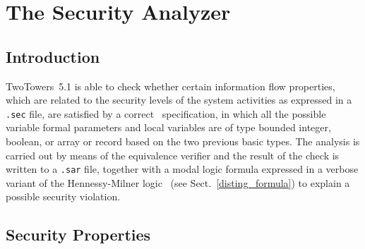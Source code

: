 \chapter{The Security Analyzer}


\section{Introduction}

TwoTowers~5.1 is able to check whether certain information flow properties, which are related to the
security levels of the system activities as expressed in a {\tt .sec} file, are satisfied by a correct
\aemilia\ specification, in which all the possible variable formal parameters and local variables are of
type bounded integer, boolean, or array or record based on the two previous basic types. The analysis is
carried out by means of the equivalence verifier and the result of the check is written to a {\tt .sar}
file, together with a modal logic formula expressed in a verbose variant of the Hennessy-Milner
logic~\cite{HM} (see Sect.~\ref{disting_formula}) to explain a possible security violation.



\section{Security Properties}

